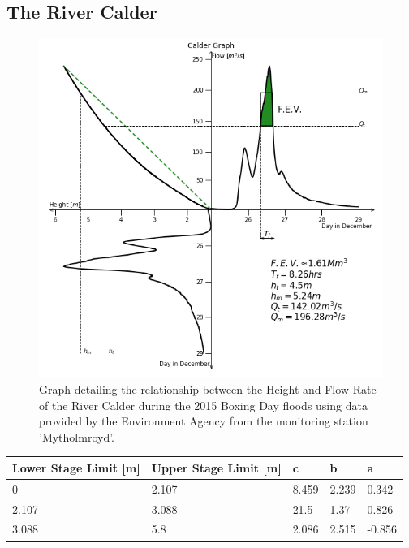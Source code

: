 \documentclass[11 pt, a4paper]{article}
\begin{document}
\subsection{The River Calder}
\begin{figure}[H]
\begin{center}
\includegraphics[width=.5\linewidth]{Calder-Quadrant_Graph.png}
\caption{Graph detailing the relationship between the Height and Flow Rate of the River Calder during the 2015 Boxing Day floods using data provided by the Environment Agency from the monitoring station 'Mytholmroyd'.}
\end{center}
\end{figure}
\begin{center}
\begin{tabular}{|l|l|l|l|l|}
\hline
Lower Stage Limit {[}m{]} & Upper Stage Limit {[}m{]} & c & b & a \\
\hline
0 & 2.107 & 8.459 & 2.239 & 0.342 \\
2.107 & 3.088 & 21.5 & 1.37 & 0.826 \\
3.088 & 5.8 & 2.086 & 2.515 & -0.856 \\
\hline
\end{tabular}
\end{center}
\end{document}

